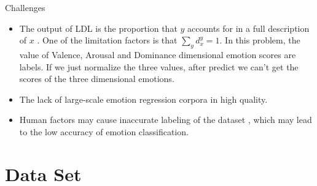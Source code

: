 \documentclass[
 size=14pt,
 paper=smartboard,  %
 mode=present, 		%
 display=slides, 	%
 style=tuliplab,  	%
 pauseslide,
 fleqn,leqno]{powerdot}
\begin{document}
\begin{slide}{Challenges }
	\begin{itemize}
		\item
		The output of LDL is the proportion that 
		$ y $ accounts for in a full description of $ x $ .
		One of the limitation factors is that 
		$ \sum_{y}  d^y_{x} = 1 $.
		In this problem, the value of 
		Valence, Arousal and Dominance 
		dimensional emotion scores are labels.
		If we just normalize the three values,
		after predict we can't get the scores
		of the three dimensional emotions.
		
		\bigskip
		
		\item
		The lack of large-scale emotion regression corpora in high quality.
		
		\bigskip
		
		\item
		Human factors may cause inaccurate labeling of the dataset , 
		which may lead to the low accuracy of emotion classification.  
		
	\end{itemize}
	
	
\end{slide}

\section{Data Set}
\end{document}
